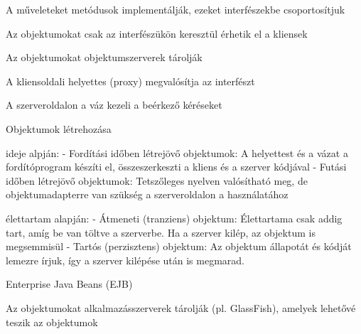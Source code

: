\documentclass[12pt]{article}
\begin{document}
\begin{description}
                                                                    \item A műveleteket metódusok implementálják, ezeket interfészekbe csoportosítjuk
                                                                    \item Az objektumokat csak az interfészükön keresztül érhetik el a kliensek
                                                                    \item Az objektumokat objektumszerverek tárolják
                                                                    \item A kliensoldali helyettes (proxy) megvalósítja az interfészt
                                                                    \item A szerveroldalon a váz kezeli a beérkező kéréseket
                                                                    \item  Objektumok létrehozása
                                                                    \item ideje alpján:
                                                                        - Fordítási időben létrejövő objektumok: A helyettest és a vázat a fordítóprogram készíti el,
                                                                        összeszerkeszti a kliens és a szerver kódjával
                                                                        - Futási időben létrejövő objektumok: Tetszőleges nyelven valósítható meg, de objektumadapterre van
                                                                        szükség a szerveroldalon a használatához
                                                                    \item élettartam alapján:
                                                                        - Átmeneti (tranziens) objektum: Élettartama csak addig tart, amíg be van töltve a szerverbe. 
                                                                        Ha a szerver kilép, az objektum is megsemmisül
                                                                        - Tartós (perzisztens) objektum: Az objektum állapotát és kódját lemezre írjuk, így a szerver kilépése után
                                                                        is megmarad.
                                                                    \item  Enterprise Java Beans (EJB)
                                                                    \item Az objektumokat alkalmazásszerverek tárolják (pl. GlassFish), amelyek lehetővé teszik az objektumok

\end{description}
\end{document}
